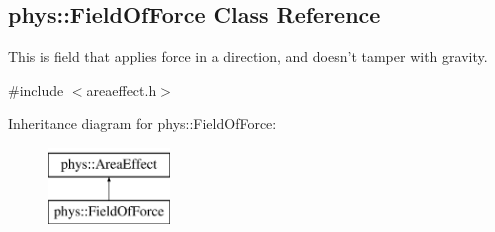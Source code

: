 \hypertarget{classphys_1_1FieldOfForce}{
\subsection{phys::FieldOfForce Class Reference}
\label{d5/d59/classphys_1_1FieldOfForce}
}


This is field that applies force in a direction, and doesn't tamper with gravity.  




{\ttfamily \#include $<$areaeffect.h$>$}

Inheritance diagram for phys::FieldOfForce:\begin{figure}[H]
\begin{center}
\leavevmode
\includegraphics[height=2.000000cm]{d5/d59/classphys_1_1FieldOfForce}
\end{center}
\end{figure}
